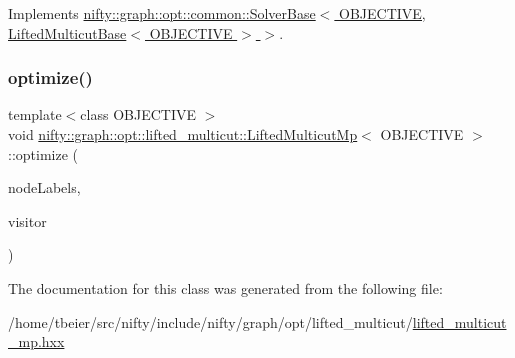 Implements \hyperlink{classnifty_1_1graph_1_1opt_1_1common_1_1SolverBase_a55e9eb645c07d6e0782ebfb990ab3c84}{nifty\+::graph\+::opt\+::common\+::\+Solver\+Base$<$ O\+B\+J\+E\+C\+T\+I\+V\+E, Lifted\+Multicut\+Base$<$ O\+B\+J\+E\+C\+T\+I\+V\+E $>$ $>$}.

\mbox{\label{classnifty_1_1graph_1_1opt_1_1lifted__multicut_1_1LiftedMulticutMp_a8892a52bab4dcae8f1926081fa627488}} 
\subsubsection{\texorpdfstring{optimize()}{optimize()}}
{\footnotesize\ttfamily template$<$class O\+B\+J\+E\+C\+T\+I\+VE $>$ \\
void \hyperlink{classnifty_1_1graph_1_1opt_1_1lifted__multicut_1_1LiftedMulticutMp}{nifty\+::graph\+::opt\+::lifted\+\_\+multicut\+::\+Lifted\+Multicut\+Mp}$<$ O\+B\+J\+E\+C\+T\+I\+VE $>$\+::optimize (\begin{DoxyParamCaption}\item[{\hyperlink{classnifty_1_1graph_1_1opt_1_1lifted__multicut_1_1LiftedMulticutMp_a98651524f908efa229d69761f4fa5491}{Node\+Labels} \&}]{node\+Labels,  }\item[{\hyperlink{classnifty_1_1graph_1_1opt_1_1lifted__multicut_1_1LiftedMulticutMp_a8169f3c3105c3179ae7a2881502826bd}{Visitor\+Base\+Type} $\ast$}]{visitor }\end{DoxyParamCaption})\hspace{0.3cm}{\ttfamily [virtual]}}



The documentation for this class was generated from the following file\+:\begin{DoxyCompactItemize}
\item 
/home/tbeier/src/nifty/include/nifty/graph/opt/lifted\+\_\+multicut/\hyperlink{lifted__multicut__mp_8hxx}{lifted\+\_\+multicut\+\_\+mp.\+hxx}\end{DoxyCompactItemize}
